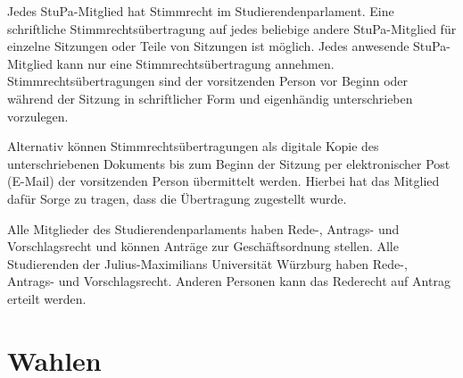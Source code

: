 \documentclass[10pt,a4paper]{scrartcl}
\begin{document}
\begin{contract}

\label{stimmrecht-und-stimmrechtsuebertragungen}

Jedes StuPa-Mitglied hat Stimmrecht im Studierendenparlament. Eine
schriftliche Stimmrechtsübertragung auf jedes beliebige andere
StuPa-Mitglied für einzelne Sitzungen oder Teile von Sitzungen ist
möglich. Jedes anwesende StuPa-Mitglied kann nur eine
Stimmrechtsübertragung annehmen. Stimmrechtsübertragungen sind der
vorsitzenden Person vor Beginn oder während der Sitzung in schriftlicher
Form und eigenhändig unterschrieben vorzulegen.

Alternativ können Stimmrechtsübertragungen als digitale Kopie des
unterschriebenen Dokuments bis zum Beginn der Sitzung per elektronischer Post
(E-Mail) der vorsitzenden Person übermittelt werden. Hierbei hat das Mitglied
dafür Sorge zu tragen, dass die Übertragung zugestellt wurde.


\label{rede--antrags--und-vorschlagsrecht}

Alle Mitglieder des Studierendenparlaments haben Rede-, Antrags- und
Vorschlagsrecht und können Anträge zur Geschäftsordnung stellen. Alle
Studierenden der Julius-Maximilians Universität Würzburg haben Rede-,
Antrags- und Vorschlagsrecht. Anderen Personen kann das Rederecht auf
Antrag erteilt werden.

\end{contract}

\section{Wahlen}\label{wahlen}
\end{document}
